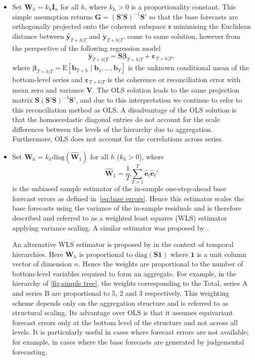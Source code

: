 \documentclass[graybox]{svmult}
\def\E{\text{E}}
\begin{document}
\begin{itemize}\parskip=1.2ex
	\item Set $\bm{W}_{h}=k_h\bm{I}_n$ for all $h$, where $k_{h} > 0$ is a proportionality constant. This simple assumption returns $\bm{G}=(\bm{S}'\bm{S})^{-1}\bm{S}'$ so that the base forecasts are orthogonally projected onto the coherent subspace $\mathfrak{s}$ minimising the Euclidean distance between $\hat{\bm{y}}_{T+h|T}$ and $\tilde{\bm{y}}_{T+h|T}$. \citet{HynEtAl2011} come to same solution, however from the perspective of the following regression model
  \begin{equation*}
    \hat{\bm{y}}_{T+h|T} = \bm{S}\bm{\beta}_{T+h|T} + \bm{\varepsilon}_{T+h|T},
  \end{equation*}
  where $\bm{\beta}_{T+h|T}=\E[\bm{b}_{T+h}\mid\bm{b}_1,\dots,\bm{b}_T]$ is the unknown conditional mean of the bottom-level series and $\bm{\varepsilon}_{T+h|T}$ is the coherence or reconciliation error with mean zero and variance $\bm{V}$. The OLS solution leads to the same projection matrix $\bm{S}(\bm{S}'\bm{S})^{-1}\bm{S}'$, and due to this interpretation we continue to refer to this reconciliation method as OLS\@. A disadvantage of the OLS solution is that the homoscedastic diagonal entries do not account for the scale differences between the levels of the hierarchy due to aggregation. Furthermore, OLS does not account for the correlations across series.

	\item Set ${\bm{W}}_{h}=k_{h}\text{diag}(\hat{\bm{W}}_{1})$ for all $h$ ($k_{h} > 0$), where
  $$
    \hat{\bm{W}}_{1} = \frac{1}{T}\sum_{T=1}^{T} \hat{\bm{e}}_{t}\hat{\bm{e}}_{t}'
  $$
  is the unbiased sample estimator of the in-sample one-step-ahead base forecast errors as defined in~\eqref{eq:base errors}. Hence this estimator scales the base forecasts using the variance of the in-sample residuals and is therefore described and referred to as a weighted least squares (WLS) estimator applying variance scaling. A similar estimator was proposed by \citet{Hyndman2016}.

  An alternative WLS estimator is proposed by \citet{AthEtAl2017} in the context of temporal hierarchies. Here $\bm{W}_{h}$ is proportional to $\text{diag}(\bm{S}\bm{1})$ where $\bm{1}$ is a unit column vector of dimension $n$. Hence the weights are proportional to the number of bottom-level variables required to form an aggregate. For example, in the hierarchy of \autoref{fig:simple tree}, the weights corresponding to the Total, series A and series B are proportional to 5, 2 and 3 respectively. This weighting scheme depends only on the aggregation structure and is referred to as structural scaling. Its advantage over OLS is that it assumes equivariant forecast errors only at the bottom level of the structure and not across all levels. It is particularly useful in cases where forecast errors are not available; for example, in cases where the base forecasts are generated by judgemental forecasting.


\end{itemize}
\end{document}
